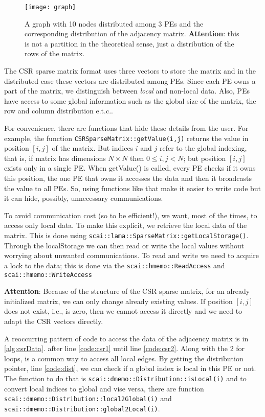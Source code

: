 \documentclass[a4paper,10pt]{article}
\newcommand{\etc}{e.t.c.}
\newcommand{\att}{\textbf{Attention}: }
\newcommand{\MI}[1]{\texttt{#1}}
\begin{document}
\begin{figure}[h]
\texttt{[image: graph]}
\caption{A graph with 10 nodes distributed among 3 PEs and the corresponding distribution of the 
adjacency matrix. \att this is not a partition in the theoretical sense, just a distribution of
the rows of the matrix.}
\label{fig:graph}
\end{figure}

The CSR sparse matrix format uses three vectors to store the matrix and in the distributed case
these vectors are distributed among PEs. Since each PE owns a part of the matrix,
we distinguish between \emph{local} and non-local data. Also, PEs have access to some global information 
such as the global size of the matrix, the row and column distribution \etc. 

For convenience, there are functions that hide these details from the user.
For example, the function \texttt{CSRSparseMatrix::getValue(i,j)} returns the value 
in position $[i,j]$
of the matrix. But indices $i$ and $j$ refer to the global indexing, that is, if matrix has dimensions
$N\times N$ then $0\leq i,j < N$; but position $[i,j]$ exists only in a single PE. When getValue() is
called, every PE checks if it owns this position, the one PE that owns it accesses the data and 
then it broadcasts the value to all PEs. So, using functions like that make it easier to write code
but it can hide, possibly, unnecessary communications.

To avoid communication cost (so to be efficient!), we want, most of the times, to access only local 
data. To make this explicit, we retrieve the local data of the matrix. 
This is done using \texttt{scai::lama::SparseMatrix::getLocalStorage()}. 
Through the localStorage we can then read or write the local values without worrying about unwanted 
communications. To read and write we need to acquire a lock to the data; this is done via the
\texttt{scai::hmemo::ReadAccess} and \texttt{scai::hmemo::WriteAccess}

\att Because of the structure of the CSR sparse matrix, for an already initialized matrix, we can only 
change already existing values. If position $[i,j]$ does not exist, i.e., is zero, then we cannot 
access it directly and we need to adapt the CSR vectors directly.

A reoccurring pattern of code to access the data of the adjacency matrix is in \cref{alg:csrData}.
after line \ref{code:csr1} until line \ref{code:csr2}. Along with the 2 for loops, is a common way to
access all local edges. 
By getting the distribution pointer, line \ref{code:dist}, we can check if a global index is local 
in this PE or not.
The function to do that is \MI{scai::dmemo::Distribution::isLocal(i)} and to convert local
indices to global and vise versa, there are function
\MI{scai::dmemo::Distribution::local2Global(i)} and \\
\MI{scai::dmemo::Distribution::global2Local(i)}.
\end{document}
